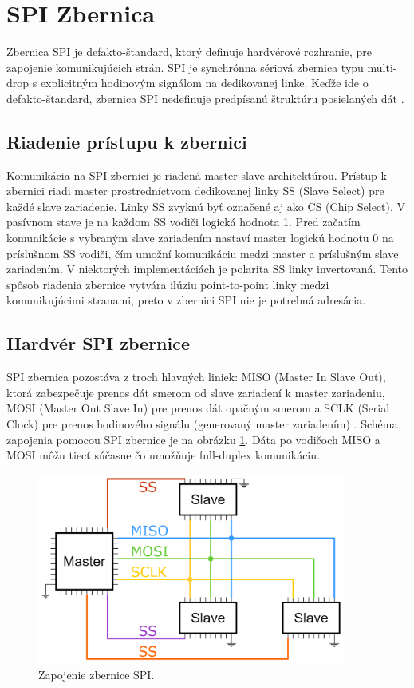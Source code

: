 \section{SPI Zbernica}
Zbernica SPI je defakto-štandard, ktorý definuje hardvérové rozhranie, pre zapojenie komunikujúcich strán. SPI je synchrónna sériová zbernica typu multi-drop s explicitným hodinovým signálom na dedikovanej linke. Keďže ide o defakto-štandard, zbernica SPI nedefinuje predpísanú štruktúru posielaných dát \cite{spiBus}.

\subsection{Riadenie prístupu k zbernici}
Komunikácia na SPI zbernici je riadená master-slave architektúrou. Prístup k zbernici riadi master prostredníctvom dedikovanej linky SS (Slave Select) pre každé slave zariadenie. Linky SS zvyknú byť označené aj ako CS (Chip Select). V pasívnom stave je na každom SS vodiči logická hodnota 1. Pred začatím komunikácie s vybraným slave zariadením nastaví master logickú hodnotu 0 na príslušnom SS vodiči, čím umožní komunikáciu medzi master a príslušným slave zariadením. V niektorých implementáciách je polarita SS linky invertovaná. Tento spôsob riadenia zbernice vytvára ilúziu point-to-point linky medzi komunikujúcimi stranami, preto v zbernici SPI nie je potrebná adresácia.

\subsection{Hardvér SPI zbernice}
SPI zbernica pozostáva z troch hlavných liniek: MISO (Master In Slave Out), ktorá zabezpečuje prenos dát smerom od slave zariadení k master zariadeniu, MOSI (Master Out Slave In) pre prenos dát opačným smerom a SCLK (Serial Clock) pre prenos hodinového signálu (generovaný master zariadením) \cite{spiBus}. Schéma zapojenia pomocou SPI zbernice je na obrázku \ref{obr:spiWiring}. Dáta po vodičoch MISO a MOSI môžu tiecť súčasne čo umožňuje full-duplex komunikáciu.

\begin{figure}
    \centerline{\includegraphics[width=0.9\textwidth]{images/spiWiring.png}}
    \caption[Zapojenie zbernice SPI]{Zapojenie zbernice SPI.}
    \label{obr:spiWiring}
\end{figure}

